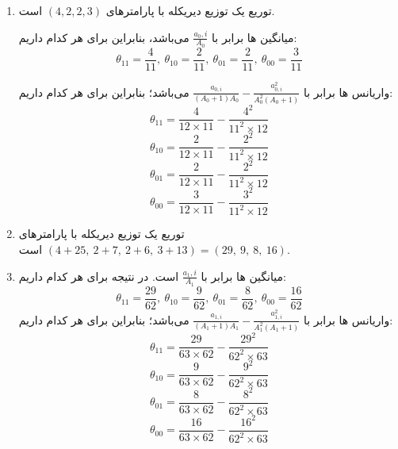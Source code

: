 \begin{enumerate}
	\item توریع  یک توزیع دیریکله با پارامترهای $(4, 2, 2, 3)$ است.
	
	میانگین ها برابر با 
	$\frac{a_0, i}{A_0}$ می‌باشد، بنابراین برای هر کدام داریم:
	$$\theta_{11} = \frac{4}{11}
	,\:  \theta_{10} = \frac{2}{11}
	,\:  \theta_{01} = \frac{2}{11}
	,\:  \theta_{00} = \frac{3}{11}
	$$
	
	واریانس ها برابر با 
	$\frac{a_{0, i}}{(A_0 + 1)A_0} - \frac{a^2_{0, i}}{A_0^2(A_0 + 1)}$
	می‌باشد؛ بنابراین برای هر کدام داریم:
	$$\theta_{11} = \frac{4}{12 \times 11} - \frac{4^2}{11^2 \times 12}
	$$
	$$\theta_{10} = \frac{2}{12 \times 11} - \frac{2^2}{11^2 \times 12}
	$$
	$$\theta_{01} = \frac{2}{12 \times 11} - \frac{2^2}{11^2 \times 12}
	$$
	$$\theta_{00} = \frac{3}{12 \times 11} - \frac{3^2}{11^2 \times 12}
	$$
	\item توریع  یک توزیع دیریکله با پارامتر‌های 
	$(4 + 25, \: 2 + 7, \: 2 + 6, \: 3 + 13)= (29, \: 9, \: 8, \: 16)$
	است.
	\item 
	میانگین ها برابر با 
	$\frac{a_1, i}{A_1}$
	است. در نتیجه برای هر کدام داریم:
	$$\theta_{11} = \frac{29}{62}
	,\:  \theta_{10} = \frac{9}{62}
	,\:  \theta_{01} = \frac{8}{62}
	,\:  \theta_{00} = \frac{16}{62}
	$$
	واریانس ها برابر با 
	$\frac{a_{1, i}}{(A_1 + 1)A_1} - \frac{a^2_{1, i}}{A_1^2(A_1 + 1)}$
	می‌باشد؛ بنابراین برای هر کدام داریم:
		$$\theta_{11} = \frac{29}{63 \times 62} - \frac{29^2}{62^2 \times 63}
$$
$$\theta_{10} = \frac{9}{63 \times 62} - \frac{9^2}{62^2 \times 63}
$$
$$\theta_{01} = \frac{8}{63 \times 62} - \frac{8^2}{62^2 \times 63}
$$
$$\theta_{00} = \frac{16}{63 \times 62} - \frac{16^2}{62^2 \times 63}
$$	
\end{enumerate}